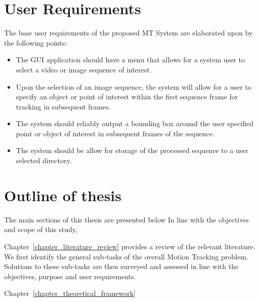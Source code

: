 \section{User Requirements}\label{introduction_user_requirements}
The base user requirements of the proposed MT System are elaborated upon by the
following points:
\begin{itemize}
    \item The GUI application should have a menu that allows for a system
        user to select a video or image sequence of interest.
    \item Upon the selection of an image sequence, the system will allow for a
        user to specify an object or point of interest within the first sequence
        frame for tracking in subsequent frames.
    \item The system should reliably output a bounding box around the user
        specified point or object of interest in subsequent frames of the
        sequence. 
    \item The system should be allow for storage of the processed sequence to
        a user selected directory.
\end{itemize}

\section{Outline of thesis}
The main sections of this thesis are presented below  In line with the objectives and scope
of this study, 

Chapter~\ref{chapter_literature_review} provides a review of the
relevant literature. We first identify the general sub-tasks of the overall
Motion Tracking problem. Solutions to these sub-tasks are then surveyed and
assessed in line with the objectives, purpose and user requirements. 

Chapter~\ref{chapter_theoretical_framework}  



